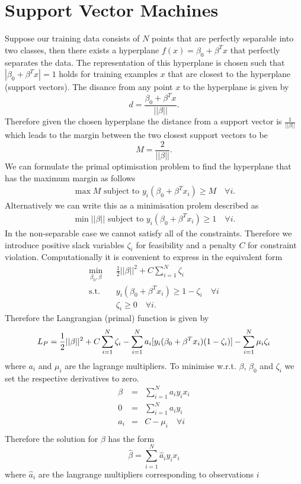 \documentclass[11pt]{article}
\begin{document}
\section*{Support Vector Machines}

Suppose our training data consists of $N$ points that are perfectly separable into two classes, then there exists a hyperplane $f(x)=\beta_0+\beta^Tx$ that perfectly separates the data. The representation of this hyperplane is chosen such that $|\beta_0+\beta^Tx|=1$ holds for training examples $x$ that are closest to the hyperplane (support vectors). The disance from any point $x$ to the hyperplane is given by
\begin{equation*}
d=\frac{\beta_0+\beta^Tx}{||\beta ||}.
\end{equation*}
Therefore given the chosen hyperplane the distance from a support vector is $\frac{1}{||\beta||}$ which leads to the margin between the two closest support vectors to be 
\begin{equation*}
M=\frac{2}{||\beta||}.
\end{equation*}
We can formulate the primal optimisation problem to find the hyperplane that has the maximum margin as follows
\begin{eqnarray*}
\max M \text{ subject to } y_i(\beta_0+\beta^Tx_i)\ge M \quad  \forall i. 
\end{eqnarray*}
Alternatively we can write this as a minimisation prolem described as
\begin{eqnarray*}
\min ||\beta || \text{ subject to } y_i(\beta_0+\beta^Tx_i)\ge 1 \quad \forall i.
\end{eqnarray*}
In the non-separable case we cannot satisfy all of the constraints. Therefore we introduce positive slack variables $\zeta_i$ for feasibility and a penalty $C$ for constraint violation. Computationally it is convenient to express in the equivalent form
\begin{eqnarray*}
\min_{\beta_0,\beta} &&\frac{1}{2}||\beta ||^2+C\sum_{i=1}^{N} \zeta_i\\
\text{s.t.} &&y_i(\beta_0+\beta^Tx_i)\ge 1-\zeta_i \quad \forall i\\
&& \zeta_i\ge 0 \quad \forall i.
\end{eqnarray*}
Therefore the Langrangian (primal) function is given by 
\begin{equation}\nonumber
L_P=\frac{1}{2}||\beta ||^2+C\sum_{i=1}^{N} \zeta_i-\sum_{i=1}^{N} a_i[y_i(\beta_0+\beta^Tx_i)\- (1-\zeta_i)]-\sum_{i=1}^{N}\mu_i\zeta_i
\end{equation}
where $a_i$ and $\mu_i$ are the lagrange multipliers. To minimise w.r.t. $\beta$, $\beta_0$ and $\zeta_i$ we set the respective derivatives to zero.
\begin{eqnarray*}
\beta &=& \sum_{i=1}^{N}a_iy_ix_i\\
0 &=& \sum_{i=1}^{N}a_iy_i\\
a_i &=& C-\mu_i\quad \forall i\\
\end{eqnarray*}
Therefore the solution for $\beta$ has the form 
\begin{equation*}
\hat{\beta}=\sum_{i=1}^{N}\hat{a}_iy_ix_i
\end{equation*}
where $\hat a_i$ are the langrange multipliers corresponding to observations $i$ 
\end{document}
